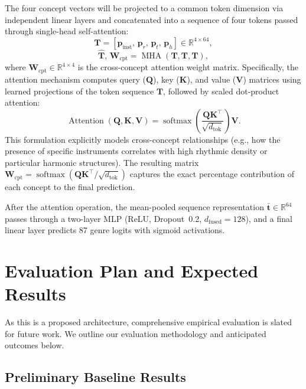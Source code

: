 \documentclass[sigconf,nonacm]{acmart}
\begin{document}
The four concept vectors will be projected to a common token dimension via independent linear
layers and concatenated into a sequence of four tokens passed through single-head self-attention:
\begin{equation}
  \mathbf{T} = [\mathbf{p}_{\text{inst}},\,\mathbf{p}_r,\,\mathbf{p}_t,\,\mathbf{p}_h]
               \in\mathbb{R}^{4\times64},
\end{equation}
\begin{equation}
  \hat{\mathbf{T}},\,\mathbf{W}_{\!\text{cpt}} = \operatorname{MHA}(\mathbf{T},\mathbf{T},\mathbf{T}),
\end{equation}
where $\mathbf{W}_{\!\text{cpt}}\in\mathbb{R}^{4\times4}$ is the cross-concept attention weight
matrix. Specifically, the attention mechanism computes query ($\mathbf{Q}$), key ($\mathbf{K}$), and value ($\mathbf{V}$) matrices using learned projections of the token sequence $\mathbf{T}$, followed by scaled dot-product attention:
\begin{equation}
  \operatorname{Attention}(\mathbf{Q},\mathbf{K},\mathbf{V}) = \operatorname{softmax}\left(\frac{\mathbf{Q}\mathbf{K}^{\top}}{\sqrt{d_{\text{tok}}}}\right)\mathbf{V}.
\end{equation}
This formulation explicitly models cross-concept relationships (e.g., how the presence of specific instruments correlates with high rhythmic density or particular harmonic structures). The resulting matrix $\mathbf{W}_{\!\text{cpt}} = \operatorname{softmax}(\mathbf{Q}\mathbf{K}^{\top}/\sqrt{d_{\text{tok}}})$ captures the exact percentage contribution of each concept to the final prediction.

After the attention operation, the mean-pooled sequence representation $\bar{\mathbf{t}}\in\mathbb{R}^{64}$ passes through a two-layer MLP (ReLU, Dropout~0.2, $d_{\text{fused}}=128$), and a final linear layer predicts 87 genre logits with sigmoid activations.

\section{Evaluation Plan and Expected Results}

As this is a proposed architecture, comprehensive empirical evaluation is slated for future work.
We outline our evaluation methodology and anticipated outcomes below.

\subsection{Preliminary Baseline Results}
\end{document}
